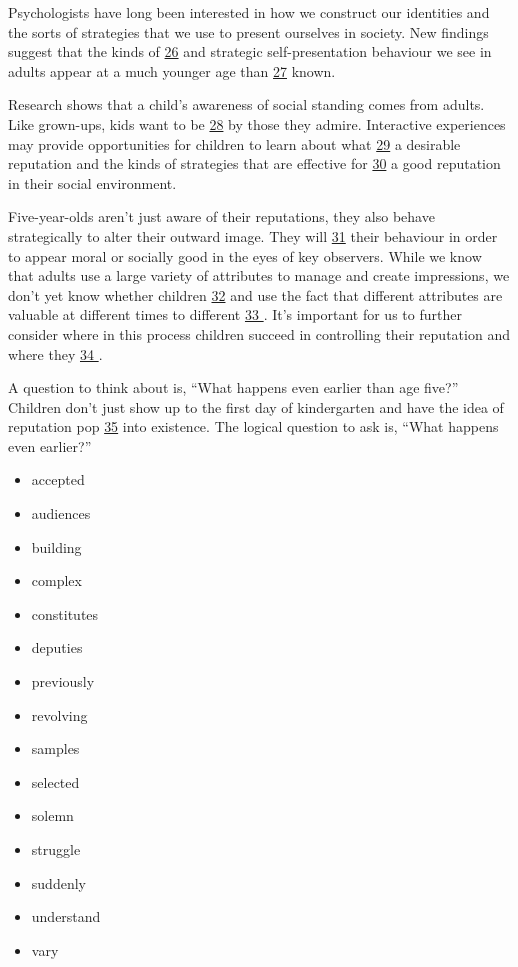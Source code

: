 \documentclass[UTF8,11pt]{ctexart}
\begin{document}
Psychologists have long been interested in how we construct our identities and the sorts of strategies that we use to present ourselves in society. New findings suggest that the kinds of \uline{26} and strategic self-presentation behaviour we see in adults appear at a much younger age than \uline{27} known.


Research shows that a child’s awareness of social standing comes from adults. Like grown-ups, kids want to be \uline{28} by those they admire. Interactive experiences may provide opportunities for children to learn about what \uline{29} a desirable reputation and the kinds of strategies that are effective for \uline{30} a good reputation in their social environment.


Five-year-olds aren’t just aware of their reputations, they also behave strategically to alter their outward image. They will \uline{31} their behaviour in order to appear moral or socially good in the eyes of key observers. While we know that adults use a large variety of attributes to manage and create impressions, we don’t yet know whether children \uline{32} and use the fact that different attributes are valuable at different times to different \uline{33 }. It’s important for us to further consider where in this process children succeed in controlling their reputation and where they \uline{34 }.


A question to think about is, “What happens even earlier than age five?” Children don’t just show up to the first day of kindergarten and have the idea of reputation pop \uline{35} into existence. The logical question to ask is, “What happens even earlier?”


\begin{itemize}[leftmargin=2em,itemsep=.2em,topsep=.4em]\item[A.] accepted
\item[B.] audiences
\item[C.] building
\item[D.] complex
\item[E.] constitutes
\item[F.] deputies
\item[G.] previously
\item[H.] revolving
\item[I.] samples
\item[J.] selected
\item[K.] solemn
\item[L.] struggle
\item[M.] suddenly
\item[N.] understand
\item[O.] vary
\end{itemize}
\end{document}

